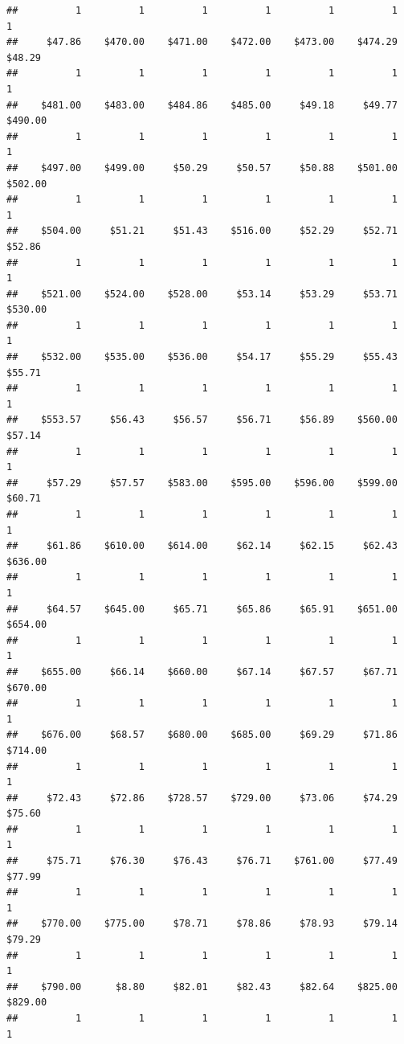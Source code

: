\begin{verbatim}
##          1          1          1          1          1          1          1 
##     $47.86    $470.00    $471.00    $472.00    $473.00    $474.29     $48.29 
##          1          1          1          1          1          1          1 
##    $481.00    $483.00    $484.86    $485.00     $49.18     $49.77    $490.00 
##          1          1          1          1          1          1          1 
##    $497.00    $499.00     $50.29     $50.57     $50.88    $501.00    $502.00 
##          1          1          1          1          1          1          1 
##    $504.00     $51.21     $51.43    $516.00     $52.29     $52.71     $52.86 
##          1          1          1          1          1          1          1 
##    $521.00    $524.00    $528.00     $53.14     $53.29     $53.71    $530.00 
##          1          1          1          1          1          1          1 
##    $532.00    $535.00    $536.00     $54.17     $55.29     $55.43     $55.71 
##          1          1          1          1          1          1          1 
##    $553.57     $56.43     $56.57     $56.71     $56.89    $560.00     $57.14 
##          1          1          1          1          1          1          1 
##     $57.29     $57.57    $583.00    $595.00    $596.00    $599.00     $60.71 
##          1          1          1          1          1          1          1 
##     $61.86    $610.00    $614.00     $62.14     $62.15     $62.43    $636.00 
##          1          1          1          1          1          1          1 
##     $64.57    $645.00     $65.71     $65.86     $65.91    $651.00    $654.00 
##          1          1          1          1          1          1          1 
##    $655.00     $66.14    $660.00     $67.14     $67.57     $67.71    $670.00 
##          1          1          1          1          1          1          1 
##    $676.00     $68.57    $680.00    $685.00     $69.29     $71.86    $714.00 
##          1          1          1          1          1          1          1 
##     $72.43     $72.86    $728.57    $729.00     $73.06     $74.29     $75.60 
##          1          1          1          1          1          1          1 
##     $75.71     $76.30     $76.43     $76.71    $761.00     $77.49     $77.99 
##          1          1          1          1          1          1          1 
##    $770.00    $775.00     $78.71     $78.86     $78.93     $79.14     $79.29 
##          1          1          1          1          1          1          1 
##    $790.00      $8.80     $82.01     $82.43     $82.64    $825.00    $829.00 
##          1          1          1          1          1          1          1 

\end{verbatim}
